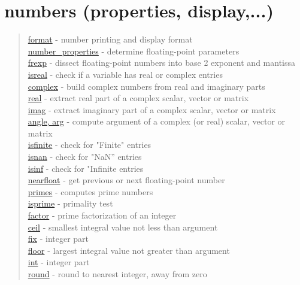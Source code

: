\chapter*{numbers (properties, display,...)} 

\begin{quote}
\noindent
\hyperlink{format}{format} - number printing and display format\\
\hyperlink{number_properties}{number\_properties} - determine floating-point parameters \\
\hyperlink{frexp}{frexp} - dissect floating-point numbers into base 2 exponent and mantissa\\
\hyperlink{isreal}{isreal} - check if a variable has real or complex entries\\
\hyperlink{complex}{complex} - build complex numbers from real and imaginary parts\\
\hyperlink{real}{real} - extract real part of a complex scalar, vector or matrix\\
\hyperlink{imag}{imag} - extract imaginary part of a complex scalar, vector or matrix\\
\hyperlink{angle, arg}{angle, arg} - compute argument of a complex (or real) scalar, vector or matrix\\
\hyperlink{isfinite}{isfinite} - check for "Finite" entries \\
\hyperlink{isnan}{isnan} - check for "NaN'' entries \\
\hyperlink{isnan}{isinf} - check for "Infinite entries \\
\hyperlink{nearfloat}{nearfloat} - get previous or next floating-point number\\
\hyperlink{primes}{primes} - computes prime numbers\\
\hyperlink{isprime}{isprime} - primality test\\
\hyperlink{factor}{factor} - prime factorization of an integer\\
\hyperlink{rounding}{ceil} - {smallest integral value not less than argument} \\
\hyperlink{rounding}{fix} - {integer part}\\
\hyperlink{rounding}{floor} - {largest integral value not greater than argument}\\
\hyperlink{rounding}{int} - {integer part} \\
\hyperlink{rounding}{round} - {round to nearest integer, away from zero}
\end{quote}




 
 
 
 
 
 
 
 


